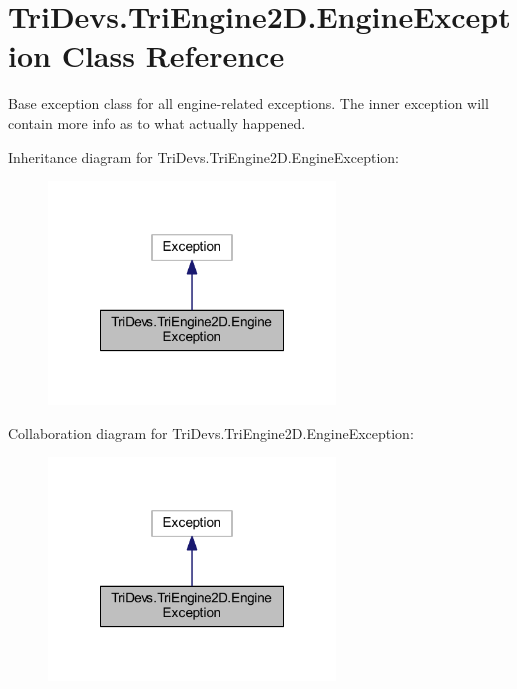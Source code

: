 \hypertarget{class_tri_devs_1_1_tri_engine2_d_1_1_engine_exception}{\section{Tri\-Devs.\-Tri\-Engine2\-D.\-Engine\-Exception Class Reference}
\label{class_tri_devs_1_1_tri_engine2_d_1_1_engine_exception}
}


Base exception class for all engine-\/related exceptions. The inner exception will contain more info as to what actually happened.  




Inheritance diagram for Tri\-Devs.\-Tri\-Engine2\-D.\-Engine\-Exception\-:
\nopagebreak
\begin{figure}[H]
\begin{center}
\leavevmode
\includegraphics[width=216pt]{class_tri_devs_1_1_tri_engine2_d_1_1_engine_exception__inherit__graph}
\end{center}
\end{figure}


Collaboration diagram for Tri\-Devs.\-Tri\-Engine2\-D.\-Engine\-Exception\-:
\nopagebreak
\begin{figure}[H]
\begin{center}
\leavevmode
\includegraphics[width=216pt]{class_tri_devs_1_1_tri_engine2_d_1_1_engine_exception__coll__graph}
\end{center}
\end{figure}


